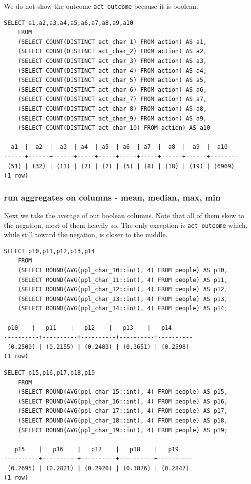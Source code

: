 \documentclass[]{report}
\begin{document}
We do not show the outcome \texttt{act\_outcome} because it is boolean.

\begin{verbatim}
SELECT a1,a2,a3,a4,a5,a6,a7,a8,a9,a10
    FROM 
    (SELECT COUNT(DISTINCT act_char_1) FROM action) AS a1,
    (SELECT COUNT(DISTINCT act_char_2) FROM action) AS a2,
    (SELECT COUNT(DISTINCT act_char_3) FROM action) AS a3,
    (SELECT COUNT(DISTINCT act_char_4) FROM action) AS a4,
    (SELECT COUNT(DISTINCT act_char_5) FROM action) AS a5,
    (SELECT COUNT(DISTINCT act_char_6) FROM action) AS a6,
    (SELECT COUNT(DISTINCT act_char_7) FROM action) AS a7,
    (SELECT COUNT(DISTINCT act_char_8) FROM action) AS a8,
    (SELECT COUNT(DISTINCT act_char_9) FROM action) AS a9,
    (SELECT COUNT(DISTINCT act_char_10) FROM action) AS a10
    
  a1  |  a2  |  a3  | a4  | a5  | a6  | a7  |  a8  |  a9  |  a10   
------+------+------+-----+-----+-----+-----+------+------+--------
 (51) | (32) | (11) | (7) | (7) | (5) | (8) | (18) | (19) | (6969) 
(1 row) 
\end{verbatim}

\pagebreak

\subsubsection{run aggregates on columns - mean, median, max,
min}\label{run-aggregates-on-columns---mean-median-max-min}

Next we take the average of our boolean columns. Note that all of them
skew to the negation, most of them heavily so. The only exception is
\texttt{act\_outcome} which, while still toward the negation, is closer
to the middle.

\begin{verbatim}
SELECT p10,p11,p12,p13,p14
    FROM
    (SELECT ROUND(AVG(ppl_char_10::int), 4) FROM people) AS p10,
    (SELECT ROUND(AVG(ppl_char_11::int), 4) FROM people) AS p11,
    (SELECT ROUND(AVG(ppl_char_12::int), 4) FROM people) AS p12,
    (SELECT ROUND(AVG(ppl_char_13::int), 4) FROM people) AS p13,
    (SELECT ROUND(AVG(ppl_char_14::int), 4) FROM people) AS p14;

 p10    |   p11    |   p12    |   p13    |   p14
----------+----------+----------+----------+----------
 (0.2509) | (0.2155) | (0.2403) | (0.3651) | (0.2598)
(1 row)    
\end{verbatim}

\begin{verbatim}
SELECT p15,p16,p17,p18,p19
    FROM
    (SELECT ROUND(AVG(ppl_char_15::int), 4) FROM people) AS p15,
    (SELECT ROUND(AVG(ppl_char_16::int), 4) FROM people) AS p16,
    (SELECT ROUND(AVG(ppl_char_17::int), 4) FROM people) AS p17,
    (SELECT ROUND(AVG(ppl_char_18::int), 4) FROM people) AS p18,
    (SELECT ROUND(AVG(ppl_char_19::int), 4) FROM people) AS p19;
    
   p15    |   p16    |   p17    |   p18    |   p19
----------+----------+----------+----------+----------
 (0.2695) | (0.2821) | (0.2920) | (0.1876) | (0.2847)
(1 row)
\end{verbatim}
\end{document}
